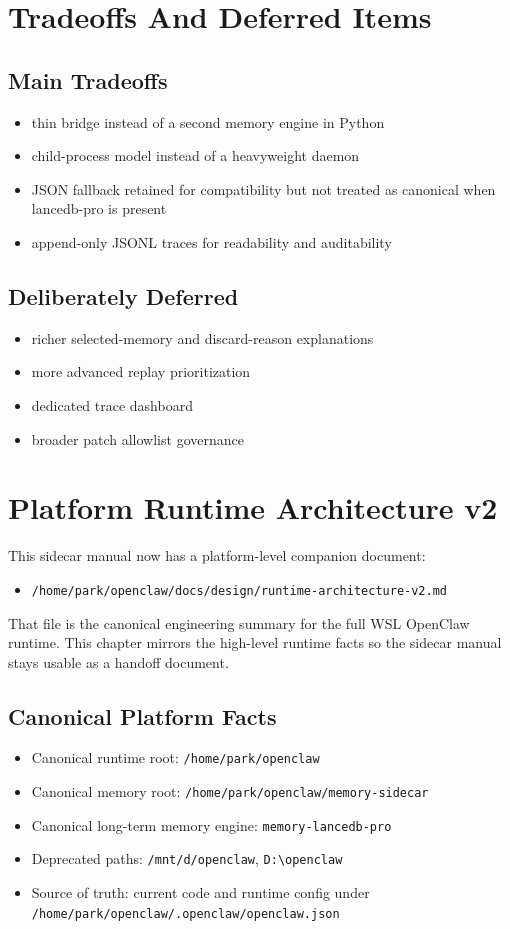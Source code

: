 \documentclass[11pt,a4paper,oneside,openany]{book}
\begin{document}
\chapter{Tradeoffs And Deferred Items}
\section{Main Tradeoffs}
\begin{itemize}
  \item thin bridge instead of a second memory engine in Python
  \item child-process model instead of a heavyweight daemon
  \item JSON fallback retained for compatibility but not treated as canonical when lancedb-pro is present
  \item append-only JSONL traces for readability and auditability
\end{itemize}
\section{Deliberately Deferred}
\begin{itemize}
  \item richer selected-memory and discard-reason explanations
  \item more advanced replay prioritization
  \item dedicated trace dashboard
  \item broader patch allowlist governance
\end{itemize}
\chapter{Platform Runtime Architecture v2}
This sidecar manual now has a platform-level companion document:
\begin{itemize}
  \item \texttt{/home/park/openclaw/docs/design/runtime-architecture-v2.md}
\end{itemize}
That file is the canonical engineering summary for the full WSL OpenClaw runtime. This chapter mirrors the high-level runtime facts so the sidecar manual stays usable as a handoff document.
\section{Canonical Platform Facts}
\begin{itemize}
  \item Canonical runtime root: \texttt{/home/park/openclaw}
  \item Canonical memory root: \texttt{/home/park/openclaw/memory-sidecar}
  \item Canonical long-term memory engine: \texttt{memory-lancedb-pro}
  \item Deprecated paths: \texttt{/mnt/d/openclaw}, \texttt{D:\textbackslash openclaw}
  \item Source of truth: current code and runtime config under \texttt{/home/park/openclaw/.openclaw/openclaw.json}
\end{itemize}
\end{document}
